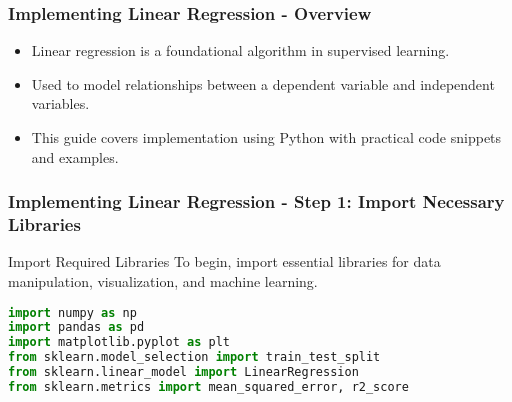 \documentclass{beamer}
\begin{document}
\begin{frame}
    \frametitle{Implementing Linear Regression - Overview}
    \begin{itemize}
        \item Linear regression is a foundational algorithm in supervised learning.
        \item Used to model relationships between a dependent variable and independent variables.
        \item This guide covers implementation using Python with practical code snippets and examples.
    \end{itemize}
\end{frame}

\begin{frame}[fragile]
    \frametitle{Implementing Linear Regression - Step 1: Import Necessary Libraries}
    \begin{block}{Import Required Libraries}
        To begin, import essential libraries for data manipulation, visualization, and machine learning.
    \end{block}
    \begin{lstlisting}[language=Python]
import numpy as np
import pandas as pd
import matplotlib.pyplot as plt
from sklearn.model_selection import train_test_split
from sklearn.linear_model import LinearRegression
from sklearn.metrics import mean_squared_error, r2_score
    \end{lstlisting}
\end{frame}
\end{document}
